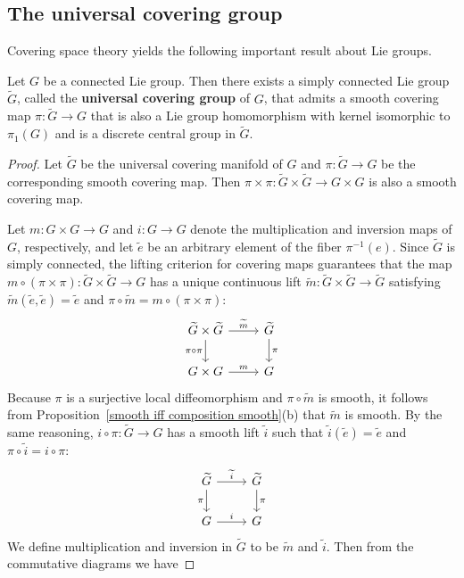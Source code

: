 \subsection{The universal covering group}
Covering space theory yields the following important result about Lie groups.
\begin{theorem}\label{Lie universal covering group}
Let $G$ be a connected Lie group. Then there exists a simply connected Lie group $\widetilde{G}$, called the \textbf{universal covering group} of $G$, that admits a smooth covering map $\pi:\widetilde{G}\to G$ that is also a Lie group homomorphism with kernel isomorphic to $\pi_1(G)$ and is a discrete central group in $\widetilde{G}$.
\end{theorem}
\begin{proof}
Let $\widetilde{G}$ be the universal covering manifold of $G$ and $\pi:\widetilde{G}\to G$ be the corresponding smooth covering map. Then $\pi\times\pi:\widetilde{G}\times\widetilde{G}\to G\times G$ is also a smooth covering map.\par
Let $m:G\times G\to G$ and $i:G\to G$ denote the multiplication and inversion maps of $G$, respectively, and let $\widetilde{e}$ be an arbitrary element of the fiber $\pi^{-1}(e)$. Since $\widetilde{G}$ is simply connected, the lifting criterion for covering maps guarantees that the map $m\circ(\pi\times \pi):\widetilde{G}\times\widetilde{G}\to G$ has a unique continuous lift $\widetilde{m}:\widetilde{G}\times\widetilde{G}\to\widetilde{G}$ satisfying $\widetilde{m}(\widetilde{e},\widetilde{e})=\widetilde{e}$ and $\pi\circ\widetilde{m}=m\circ(\pi\times\pi)$:
\[\begin{tikzcd}
\widetilde{G}\times\widetilde{G}\ar[r,"\widetilde{m}"]\ar[d,swap,"\pi\circ\pi"]&\widetilde{G}\ar[d,"\pi"]\\
G\times G\ar[r,"m"]&G
\end{tikzcd}\]
Because $\pi$ is a surjective local diffeomorphism and $\pi\circ\widetilde{m}$ is smooth, it follows from Proposition~\ref{smooth iff composition smooth}(b) that $\widetilde{m}$ is smooth. By the same reasoning, $i\circ\pi:\widetilde{G}\to G$ has a smooth lift $\widetilde{i}$ such that $\widetilde{i}(\widetilde{e})=\widetilde{e}$ and $\pi\circ\widetilde{i}=i\circ\pi$:
\[\begin{tikzcd}
\widetilde{G}\ar[r,"\widetilde{i}"]\ar[d,swap,"\pi"]&\widetilde{G}\ar[d,"\pi"]\\
G\ar[r,"i"]&G
\end{tikzcd}\]
We define multiplication and inversion in $\widetilde{G}$ to be $\widetilde{m}$ and $\widetilde{i}$. Then from the commutative diagrams we have

\end{proof}
